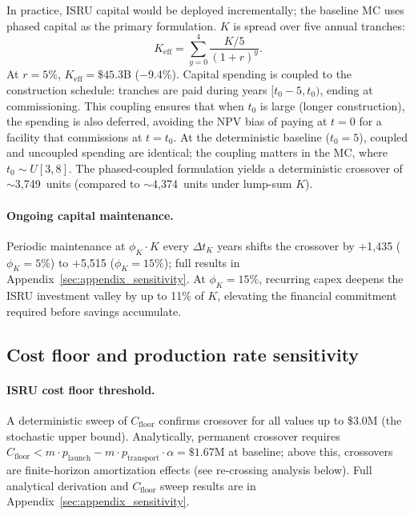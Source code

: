 \documentclass[preprint,12pt]{elsarticle}
\begin{document}
In practice, ISRU capital would be deployed incrementally; the baseline MC uses phased capital as the primary formulation. $K$ is spread over five annual tranches:
\begin{equation}
  K_{\mathrm{eff}} = \sum_{y=0}^{4} \frac{K/5}{(1+r)^y}.
  \label{eq:phased_capital}
\end{equation}
At $r = 5\%$, $K_{\mathrm{eff}} = \$45.3$B ($-$9.4\%). Capital spending is coupled to the construction schedule: tranches are paid during years $[t_0 - 5, t_0)$, ending at commissioning. This coupling ensures that when $t_0$ is large (longer construction), the spending is also deferred, avoiding the NPV bias of paying at $t = 0$ for a facility that commissions at $t = t_0$. At the deterministic baseline ($t_0 = 5$), coupled and uncoupled spending are identical; the coupling matters in the MC, where $t_0 \sim U[3,8]$. The phased-coupled formulation yields a deterministic crossover of $\sim$3{,}749~units (compared to $\sim$4{,}374~units under lump-sum $K$).

\paragraph{Ongoing capital maintenance.} Periodic maintenance at $\phi_K \cdot K$ every $\Delta t_K$ years shifts the crossover by $+$1{,}435 ($\phi_K = 5\%$) to $+$5{,}515 ($\phi_K = 15\%$); full results in Appendix~\ref{sec:appendix_sensitivity}. At $\phi_K = 15\%$, recurring capex deepens the ISRU investment valley by up to 11\% of $K$, elevating the financial commitment required before savings accumulate.

\subsection{Cost floor and production rate sensitivity}
\label{sec:cfloor_prodrate}

\paragraph{ISRU cost floor threshold.} A deterministic sweep of $C_{\mathrm{floor}}$ confirms crossover for all values up to \$3.0M (the stochastic upper bound). Analytically, permanent crossover requires $C_{\mathrm{floor}} < m \cdot p_{\mathrm{launch}} - m \cdot p_{\mathrm{transport}} \cdot \alpha = \$1.67$M at baseline; above this, crossovers are finite-horizon amortization effects (see re-crossing analysis below). Full analytical derivation and $C_{\mathrm{floor}}$ sweep results are in Appendix~\ref{sec:appendix_sensitivity}.
\end{document}
